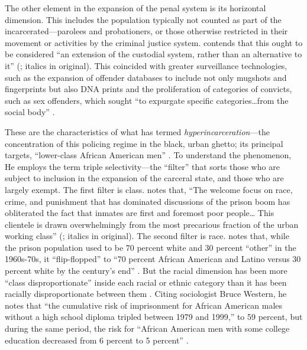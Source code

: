 \documentclass[12pt]{article}
\begin{document}
The other element in the expansion of the penal system is its horizontal dimension. This includes the population typically not counted as part of the incarcerated—parolees and probationers, or those otherwise restricted in their movement or activities by the criminal justice system. \citeauthor{wacquantClassRaceHyperincarceration2010} contends that this ought to be considered “an extension of the custodial system, rather than an alternative to it” (\citeyear[76]{wacquantClassRaceHyperincarceration2010}; italics in original). This coincided with greater surveillance technologies, such as the expansion of offender databases to include not only mugshots and fingerprints but also DNA prints and the proliferation of categories of convicts, such as sex offenders, which sought “to expurgate specific categories…from the social body” \parencite[76]{wacquantClassRaceHyperincarceration2010}.

These are the characteristics of what \citeauthor{wacquantClassRaceHyperincarceration2010} has termed \emph{hyperincarceration}—the concentration of this policing regime in the black, urban ghetto; its principal targets, “lower-class African American men” \parencite*[78]{wacquantClassRaceHyperincarceration2010}. To understand the phenomenon, He employs the term triple selectivity—the “filter” that sorts those who are subject to inclusion in the expansion of the carceral state, and those who are largely exempt. The first filter is class. \citeauthor{wacquantClassRaceHyperincarceration2010} notes that, “The welcome focus on race, crime, and punishment that has dominated discussions of the prison boom has obliterated the fact that inmates are first and foremost poor people… This clientele is drawn overwhelmingly from the most precarious fraction of the urban working class” (\citeyear[78--79]{wacquantClassRaceHyperincarceration2010}; italics in original). The second filter is race. \citeauthor{wacquantClassRaceHyperincarceration2010} notes that, while the prison population used to be 70 percent white and 30 percent “other” in the 1960s-70s, it “flip-flopped” to “70 percent African American and Latino versus 30 percent white by the century’s end” \parencite*[79--80]{wacquantClassRaceHyperincarceration2010}. But the racial dimension has been more “class disproportionate” inside each racial or ethnic category than it has been racially disproportionate between them \parencite*[80]{wacquantClassRaceHyperincarceration2010}. Citing sociologist Bruce Western, he notes that “the cumulative risk of imprisonment for African American males without a high school diploma tripled between 1979 and 1999,” to 59 percent, but during the same period, the risk for “African American men with some college education decreased from 6 percent to 5 percent” \parencite*[79]{wacquantClassRaceHyperincarceration2010}.
\end{document}
